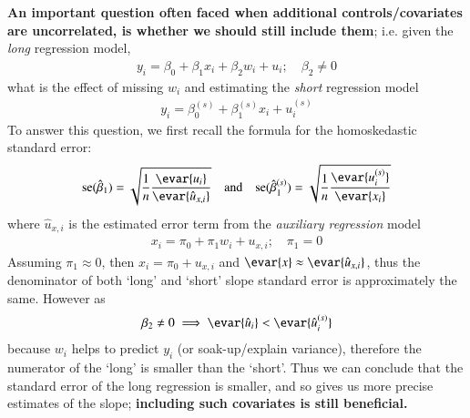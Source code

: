             \textbf{An important question often faced when additional controls/covariates are uncorrelated, is whether we should still include them}; i.e. given the \textit{long} regression model, 
            \begin{align}
                y_i = \beta_0 + \beta_1 x_i + \beta_2 w_i + u_i; \quad \beta_2 \neq 0
            \end{align}
            what is the effect of missing $w_i$ and estimating the \textit{short} regression model
            \begin{align}
                y_i = \beta_0^{(s)} + \beta_1^{(s)} x_i + u_i^{(s)}
            \end{align}
            To answer this question, we first recall the formula for the homoskedastic standard error:
            \begin{align}
                \mathrm{se}(\hat\beta_1) = \sqrt {\frac{1}{n}\frac{\evar{u_i}}{\evar{\hat u_{x,i}}}}\quad\text{and}\quad\mathrm{se}(\hat\beta_1^{(s)}) = \sqrt {\frac{1}{n}\frac{\evar{u^{(s)}_i}}{\evar{x_i}}}
            \end{align}
            where $\hat u_{x,i}$ is the estimated error term from the \textit{auxiliary regression} model
            \begin{align}
                x_i = \pi_0+\pi_1 w_i + u_{x,i} ;\quad \pi_1=0
            \end{align}
            Assuming $\pi_1 \approx 0$, then $x_i = \pi_0 + u_{x,i}$ and $\evar{x} \approx \evar{\hat u_{x,i}}$, thus the denominator of both `long' and `short' slope standard error is approximately the same. However as
            \begin{align}
                \beta_2 \neq0 \implies \evar{\hat u_i} < \evar{\hat u^{(s)}_i}
            \end{align}
            because $w_i$ helps to predict $y_i$ (or soak-up/explain variance), therefore the numerator of the `long' is smaller than the `short'.  Thus we can conclude that the standard error of the long regression is smaller, and so gives us more precise estimates of the slope; \textbf{including such covariates is still beneficial.}

            
